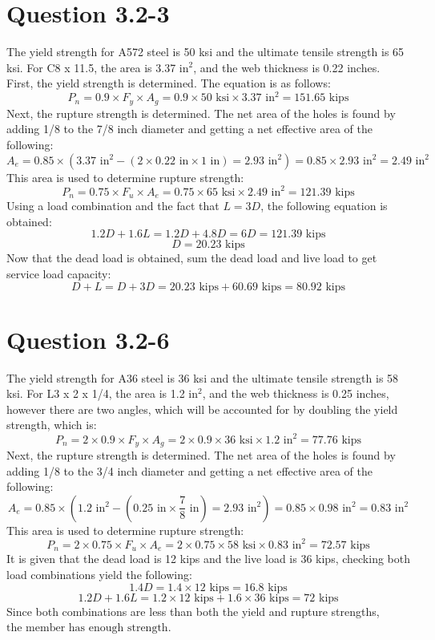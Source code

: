\documentclass{article}
\begin{document}
\section*{Question 3.2-3}
The yield strength for A572 steel is 50 ksi and the ultimate tensile strength is 65 ksi. For C8 x 11.5, the area is 3.37 $\text{in}^2$, and the web thickness is 0.22 inches. First, the yield strength is determined. The equation is as follows: 
\[P_n = 0.9 \times F_y \times A_g=0.9\times 50\text{ ksi}\times3.37 \text{ in}^2=151.65\text{ kips}\]
Next, the rupture strength is determined. The net area of the holes is found by adding 1/8 to the 7/8 inch diameter and getting a net effective area of the following: 
\[A_e = 0.85\times\left(3.37\text{ in}^2-(2\times0.22\text{ in}\times 1\text{ in})=2.93\text{ in}^2\right)=0.85\times2.93\text{ in}^2=2.49\text{ in}^2\]
This area is used to determine rupture strength: 
\[P_n=0.75\times F_u \times A_e=0.75\times65\text{ ksi}\times2.49\text{ in}^2=121.39\text{ kips}\]
Using a load combination and the fact that $L=3D$, the following equation is obtained: 
\[1.2D+1.6L=1.2D+4.8D=6D=121.39\text{ kips}\] 
\[D = 20.23\text{ kips}\] 
Now that the dead load is obtained, sum the dead load and live load to get service load capacity: 
\[D+L =D+3D= 20.23\text{ kips} + 60.69\text{ kips} = \boxed{80.92\text{ kips}}\]
\section*{Question 3.2-6}
The yield strength for A36 steel is 36 ksi and the ultimate tensile strength is 58 ksi. For L3 x 2 x 1/4, the area is 1.2 $\text{in}^2$, and the web thickness is 0.25 inches, however there are two angles, which will be accounted for by doubling the yield strength, which is: 
\[P_n=2\times 0.9\times F_y\times A_g = 2\times 0.9\times 36\text{ ksi}\times 1.2\text{ in}^2 = 77.76\text{ kips}\] 
Next, the rupture strength is determined. The net area of the holes is found by adding 1/8 to the 3/4 inch diameter and getting a net effective area of the following: 
\[A_e=0.85\times\left(1.2\text{ in}^2-(0.25\text{ in}\times \frac{7}{8}\text{ in})=2.93\text{ in}^2\right)=0.85\times0.98\text{ in}^2=0.83\text{ in}^2\] 
This area is used to determine rupture strength: 
\[P_n=2\times 0.75\times F_u \times A_e=2\times0.75\times58\text{ ksi}\times0.83\text{ in}^2=72.57\text{ kips}\]
It is given that the dead load is 12 kips and the live load is 36 kips, checking both load combinations yield the following: 
\[1.4D = 1.4\times 12\text{ kips}=16.8\text{ kips}\] 
\[1.2D+1.6L=1.2\times12\text{ kips}+1.6\times36\text{ kips}=72\text{ kips}\] 
Since both combinations are less than both the yield and rupture strengths, $\boxed{\text{the member has enough strength}}$.
\newpage
\end{document}
